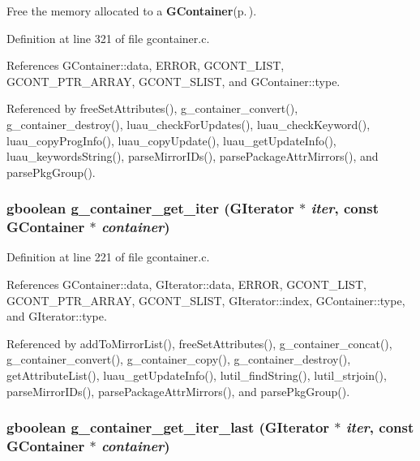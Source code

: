 Free the memory allocated to a {\bf GContainer}{\rm (p.\,\pageref{structGContainer})}. 



Definition at line 321 of file gcontainer.c.

References GContainer::data, ERROR, GCONT\_\-LIST, GCONT\_\-PTR\_\-ARRAY, GCONT\_\-SLIST, and GContainer::type.

Referenced by free\-Set\-Attributes(), g\_\-container\_\-convert(), g\_\-container\_\-destroy(), luau\_\-check\-For\-Updates(), luau\_\-check\-Keyword(), luau\_\-copy\-Prog\-Info(), luau\_\-copy\-Update(), luau\_\-get\-Update\-Info(), luau\_\-keywords\-String(), parse\-Mirror\-IDs(), parse\-Package\-Attr\-Mirrors(), and parse\-Pkg\-Group().
\subsubsection{\setlength{\rightskip}{0pt plus 5cm}gboolean g\_\-container\_\-get\_\-iter ({\bf GIterator} $\ast$ {\em iter}, const {\bf GContainer} $\ast$ {\em container})}\label{gcontainer_8h_a13}




Definition at line 221 of file gcontainer.c.

References GContainer::data, GIterator::data, ERROR, GCONT\_\-LIST, GCONT\_\-PTR\_\-ARRAY, GCONT\_\-SLIST, GIterator::index, GContainer::type, and GIterator::type.

Referenced by add\-To\-Mirror\-List(), free\-Set\-Attributes(), g\_\-container\_\-concat(), g\_\-container\_\-convert(), g\_\-container\_\-copy(), g\_\-container\_\-destroy(), get\-Attribute\-List(), luau\_\-get\-Update\-Info(), lutil\_\-find\-String(), lutil\_\-strjoin(), parse\-Mirror\-IDs(), parse\-Package\-Attr\-Mirrors(), and parse\-Pkg\-Group().
\subsubsection{\setlength{\rightskip}{0pt plus 5cm}gboolean g\_\-container\_\-get\_\-iter\_\-last ({\bf GIterator} $\ast$ {\em iter}, const {\bf GContainer} $\ast$ {\em container})}\label{gcontainer_8h_a14}




